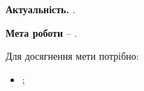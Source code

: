 
\textbf{Актуальність.}  \cite{example}.

\textbf{Мета роботи} -- .

Для досягнення мети потрібно:
\begin{itemize}
\item {};
\end{itemize}
